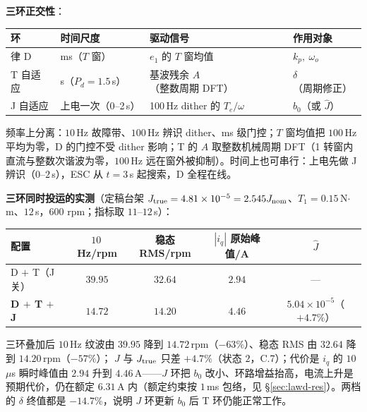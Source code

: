 \documentclass[11pt,a4paper]{article}
\theoremstyle{remark}\newtheorem{remark}{注}
\begin{document}
\textbf{三环正交性}：
\begin{center}\footnotesize
\begin{tabular}{@{}llll@{}}
\toprule
环 & 时间尺度 & 驱动信号 & 作用对象\\
\midrule
律 D & ms（$T$ 窗） & $e_1$ 的 $T$ 窗均值 & $k_p,\ \omega_o$\\
T 自适应 & s（$P_d=1.5$\,s） & 基波残余 $A$（整数周期 DFT） & $\delta$（周期修正）\\
J 自适应 & 上电一次（0--2\,s） & 100\,Hz dither 的 $T_e/\omega$ & $b_0$（或 $\hat J$）\\
\bottomrule
\end{tabular}
\end{center}
频率上分离：$10$\,Hz 故障带、$100$\,Hz 辨识 dither、ms 级门控；$T$ 窗均值把 $100$\,Hz 平均为零，D 的门控不受 dither 影响；T 的 $A$ 取整数机械周期 DFT（1 转窗内直流与整数次谐波为零，$100$\,Hz 远在窗外被抑制）。时间上也可串行：上电先做 J 辨识（$0$--$2$\,s），ESC 从 $t=3$\,s 起搜索，D 全程在线。

\textbf{三环同时投运的实测}（定稿台架 $J_{\rm true}=4.81\times10^{-5}=2.545J_{\rm nom}$、$T_1=0.15$\,N$\cdot$m、$12$\,s，600 rpm；指标取 $11$--$12$\,s）：
\begin{center}\footnotesize
\begin{tabular}{@{}lcccc@{}}
\toprule
配置 & $10$\,Hz/rpm & 稳态 RMS/rpm & $|i_q|$ 原始峰值/A & $\hat J$\\
\midrule
D $+$ T（J 关） & $39.95$ & $32.64$ & $2.94$ & ---\\
\textbf{D $+$ T $+$ J} & $\mathbf{14.72}$ & $\mathbf{14.20}$ & $4.46$ & $5.04\times10^{-5}$（$+4.7\%$）\\
\bottomrule
\end{tabular}
\end{center}
三环叠加后 $10$\,Hz 纹波由 $39.95$ 降到 $14.72$\,rpm（$-63\%$）、稳态 RMS 由 $32.64$ 降到 $14.20$\,rpm（$-57\%$）；
$\hat J$ 与 $J_{\rm true}$ 只差 $+4.7\%$（状态 $2$，C.7）；代价是 $i_q$ 的 $10$\,$\mu$s 瞬时峰值由 $2.94$ 升到 $4.46$\,A——$J$ 环把 $b_0$ 改小、环路增益抬高，电流上升是预期代价，仍在额定 $6.31$\,A 内（额定约束按 $1$\,ms 包络，见 §\ref{sec:lawd-res}）。两档的 $\delta$ 终值都是 $-14.7\%$，说明 $J$ 环更新 $b_0$ 后 T 环仍能正常工作。
\end{document}
